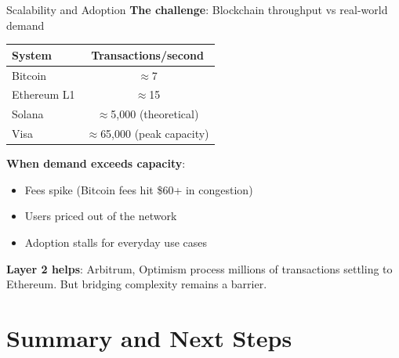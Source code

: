 \documentclass[10pt]{beamer}
\begin{document}
\begin{frame}{Scalability and Adoption}
  \textbf{The challenge}: Blockchain throughput vs real-world demand
  
  \vspace{0.5em}
  \begin{center}
  \begin{tabular}{lc}
    \toprule
    \textbf{System} & \textbf{Transactions/second} \\
    \midrule
    Bitcoin & $\approx$7 \\
    Ethereum L1 & $\approx$15 \\
    Solana & $\approx$5,000 (theoretical) \\
    Visa & $\approx$65,000 (peak capacity) \\
    \bottomrule
  \end{tabular}
  \end{center}
  
  \vspace{1em}
  \textbf{When demand exceeds capacity}:
  \begin{itemize}
    \item Fees spike (Bitcoin fees hit \$60+ in congestion)
    \item Users priced out of the network
    \item Adoption stalls for everyday use cases
  \end{itemize}
  
  \vspace{0.5em}
  \textbf{Layer 2 helps}: Arbitrum, Optimism process millions of transactions settling to Ethereum. But bridging complexity remains a barrier.
\end{frame}

\section{Summary and Next Steps}
\end{document}
